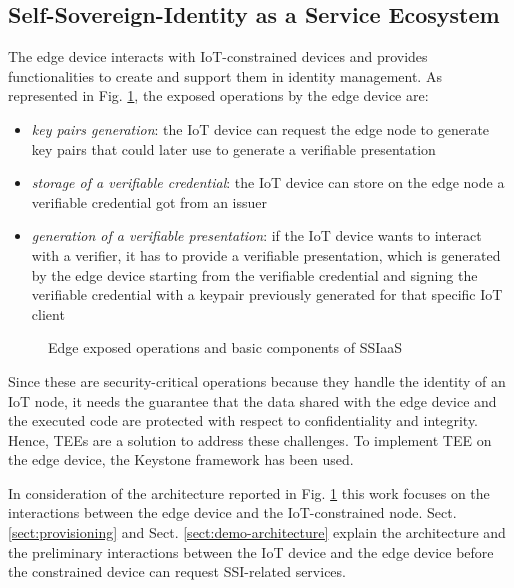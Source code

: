 \subsection{Self-Sovereign-Identity as a Service Ecosystem}
\label{sec:SSIaaS-ecosystem}
The edge device interacts with IoT-constrained devices and provides functionalities to create and support them in identity management. As represented in Fig. \ref{poc-design}, the exposed operations by the edge device are:
\begin{itemize}
    \item \textit{key pairs generation}: the IoT device can request the edge node to generate key pairs that could later use to generate a verifiable presentation
    \item \textit{storage of a verifiable credential}: the IoT device can store on the edge node a verifiable credential got from an issuer
    \item \textit{generation of a verifiable presentation}: if the IoT device wants to interact with a verifier, it has to provide a verifiable presentation, which is generated by the edge device starting from the verifiable credential and signing the verifiable credential with a keypair previously generated for that specific IoT client
\end{itemize}

\begin{figure}[H]
    \centering
    
    \caption{Edge exposed operations and basic components of SSIaaS}
    \label{poc-design}
\end{figure}

Since these are security-critical operations because they handle the identity of an IoT node, it needs the guarantee that the data shared with the edge device and the executed code are protected with respect to confidentiality and integrity. 
Hence, TEEs are a solution to address these challenges. To implement TEE on the edge device, the Keystone framework has been used. 

In consideration of the architecture reported in Fig. \ref{poc-design} this work focuses on the interactions between the edge device and the IoT-constrained node. 
Sect. \ref{sect:provisioning} and Sect. \ref{sect:demo-architecture} explain the architecture and the preliminary interactions between the IoT device and the edge device before the constrained device can request SSI-related services. 



